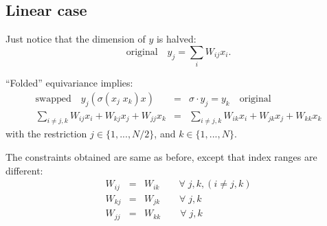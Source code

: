 \subsection{Linear case}

Just notice that the dimension of $y$ is halved:
\begin{equation}
\boxed{\mbox{original}} \quad y_j = \sum_i W_{ij} x_i .
\end{equation}

``Folded'' equivariance implies:
\begin{eqnarray}
\boxed{\mbox{swapped}} \quad y_j ( \sigma(x_j \; x_k) x) %
&=& \sigma \cdot y_j = y_k \quad \boxed{\mbox{original}} \\
\sum_{i \neq j,k} W_{ij} x_i + W_{kj} x_j + W_{jj} x_k &=& \sum_{i \neq j,k} W_{ik} x_i + W_{jk} x_j + W_{kk} x_k  \nonumber
\end{eqnarray}
with the restriction $j \in \{ 1,..., N/2 \}$, and $k \in \{ 1,..., N \}$.

The constraints obtained are same as before, except that index ranges are different:
\begin{eqnarray}
W_{ij} &=& W_{ik} \quad \quad \forall \;  j, k, (i \neq j, k) \nonumber \\
W_{kj} &=& W_{jk} \quad \quad \forall \;  j, k \nonumber \\
W_{jj} &=& W_{kk} \quad \quad \forall \;  j, k \nonumber
\end{eqnarray}

